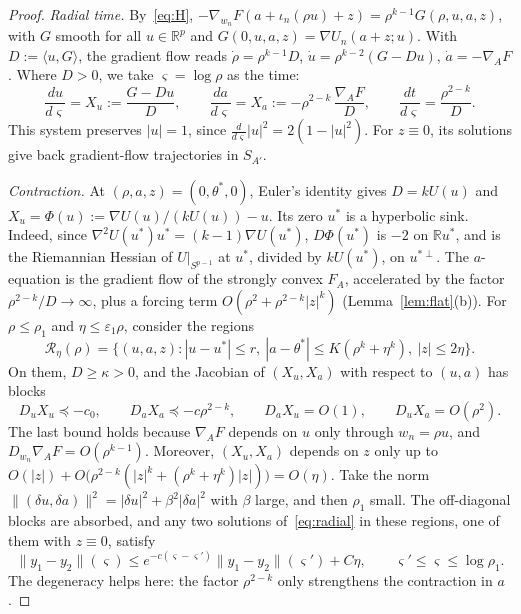 \documentclass[11pt]{article}
\theoremstyle{definition}
\theoremstyle{remark}
\newcommand{\R}{\mathbb{R}}
\newcommand{\cR}{\mathcal{R}}
\newcommand{\eps}{\varepsilon}
\newcommand{\ip}[2]{\langle #1,#2\rangle}
\begin{document}
\begin{proof}
\emph{Radial time.} By~\eqref{eq:H}, $-\nabla_{w_n}F(a+\iota_n(\rho u)+z)=\rho^{k-1}G(\rho,u,a,z)$, with $G$ smooth for all $u\in\R^p$ and $G(0,u,a,z)=\nabla U_n(a+z;u)$. With $D:=\ip{u}{G}$, the gradient flow reads $\dot\rho=\rho^{k-1}D$, $\dot u=\rho^{k-2}(G-Du)$, $\dot a=-\nabla_AF$. Where $D>0$, we take $\varsigma=\log\rho$ as the time:
\begin{equation}\label{eq:radial}
\frac{du}{d\varsigma}=X_u:=\frac{G-Du}{D},\qquad\frac{da}{d\varsigma}=X_a:=-\rho^{2-k}\,\frac{\nabla_AF}{D},\qquad\frac{dt}{d\varsigma}=\frac{\rho^{2-k}}{D}.
\end{equation}
This system preserves $|u|=1$, since $\frac{d}{d\varsigma}|u|^2=2(1-|u|^2)$. For $z\equiv0$, its solutions give back gradient-flow trajectories in $S_{A'}$.

\emph{Contraction.} At $(\rho,a,z)=(0,\theta^*,0)$, Euler's identity gives $D=kU(u)$ and $X_u=\Phi(u):=\nabla U(u)/(kU(u))-u$. Its zero $u^*$ is a hyperbolic sink. Indeed, since $\nabla^2U(u^*)u^*=(k-1)\nabla U(u^*)$, $D\Phi(u^*)$ is $-2$ on $\R u^*$, and is the Riemannian Hessian of $U|_{S^{p-1}}$ at $u^*$, divided by $kU(u^*)$, on $u^{*\perp}$. The $a$-equation is the gradient flow of the strongly convex $F_A$, accelerated by the factor $\rho^{2-k}/D\to\infty$, plus a forcing term $O(\rho^2+\rho^{2-k}|z|^k)$ (Lemma~\ref{lem:flat}(b)). For $\rho\le\rho_1$ and $\eta\le\eps_1\rho$, consider the regions
\[
\cR_\eta(\rho)=\{(u,a,z):|u-u^*|\le r,\ |a-\theta^*|\le K(\rho^k+\eta^k),\ |z|\le2\eta\}.
\]
On them, $D\ge\kappa>0$, and the Jacobian of $(X_u,X_a)$ with respect to $(u,a)$ has blocks
\[
D_uX_u\preceq-c_0,\qquad D_aX_a\preceq-c\rho^{2-k},\qquad D_aX_u=O(1),\qquad D_uX_a=O(\rho^2).
\]
The last bound holds because $\nabla_AF$ depends on $u$ only through $w_n=\rho u$, and $D_{w_n}\nabla_AF=O(\rho^{k-1})$. Moreover, $(X_u,X_a)$ depends on $z$ only up to $O(|z|)+O\big(\rho^{2-k}(|z|^k+(\rho^k+\eta^k)|z|)\big)=O(\eta)$. Take the norm $\|(\delta u,\delta a)\|^2=|\delta u|^2+\beta^2|\delta a|^2$ with $\beta$ large, and then $\rho_1$ small. The off-diagonal blocks are absorbed, and any two solutions of~\eqref{eq:radial} in these regions, one of them with $z\equiv0$, satisfy
\begin{equation}\label{eq:contraction}
\|y_1-y_2\|(\varsigma)\le e^{-c(\varsigma-\varsigma')}\|y_1-y_2\|(\varsigma')+C\eta,\qquad \varsigma'\le\varsigma\le\log\rho_1.
\end{equation}
The degeneracy helps here: the factor $\rho^{2-k}$ only strengthens the contraction in $a$.


\end{proof}
\end{document}
